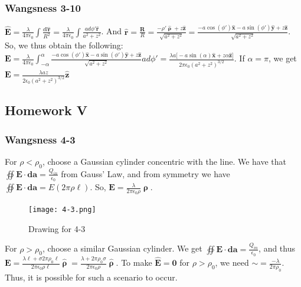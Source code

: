 \documentclass{article}
\theoremstyle{mystyle}
\begin{document}
\subsubsection{Wangsness 3-10}
$\hat{\mathbf{E}} = \frac{\lambda}{4\pi\epsilon_0} \int \frac{dl \hat{\mathbf{r}}}{R^2} = \frac{\lambda}{4\pi \epsilon_0} \int \frac{ad\phi' \hat{\mathbf{r}}}{a^2+z^2}$. And $\hat{\mathbf{r}} = \frac{\mathbf{R}}{R} = \frac{-\rho' \hat{\boldsymbol{\uprho}}+z\hat{\mathbf{z}}}{\sqrt{a^2+z^2}} = \frac{-a\cos(\phi')\hat{\mathbf{x}}-a\sin(\phi')\hat{\mathbf{y}}+z\hat{\mathbf{z}}}{\sqrt{a^2+z^2}}$. So, we thus obtain the following: \\ $\mathbf{E} = \frac{\lambda}{4\pi \epsilon_0} \int_{-\alpha}^{\alpha} \frac{-a\cos(\phi')\hat{\mathbf{x}}-a\sin(\phi')\hat{\mathbf{y}}+z\hat{\mathbf{z}}}{\sqrt{a^2+z^2}}ad\phi' = \frac{\lambda a\big[ -a\sin(\alpha)\hat{\mathbf{x}}+z\alpha \hat{\mathbf{z}}\big]}{2\pi \epsilon_0 (a^2+z^2)^{3/2}}$. If $\alpha = \pi$, we get $\mathbf{E} = \frac{\lambda a z}{2\epsilon_0 (a^2+z^2)^{3/2}}\hat{\mathbf{z}}$
\subsection{Homework V}
\subsubsection{Wangsness 4-3}
For $\rho<\rho_0$, choose a Gaussian cylinder concentric with the line. We have that $\oiint \mathbf{E}\cdot \mathbf{da} = \frac{Q_{in}}{\epsilon_0}$ from Gauss' Law, and from symmetry we have $\oiint \mathbf{E}\cdot \mathbf{da} = E(2\pi \rho \ell)$. So, $\mathbf{E} = \frac{\lambda}{2\pi \epsilon_0 \rho}\hat{\boldsymbol{\uprho}}$.
\begin{figure}[htbp]
\begin{center}
\texttt{[image: 4-3.png]}
\end{center}
\caption{Drawing for 4-3}
\end{figure}
For $\rho>\rho_0$, choose a similar Gaussian cylinder. We get $\oiint \mathbf{E}\cdot \mathbf{da} = \frac{Q_{in}}{\epsilon_0}$, and thus $\mathbf{E} = \frac{\lambda \ell + \sigma 2\pi \rho_0 \ell}{2\pi \epsilon_0 \rho \ell}\hat{\boldsymbol{\uprho}} = \frac{\lambda+2\pi \rho_0 \sigma}{2\pi \epsilon_0 \rho}\hat{\boldsymbol{\uprho}}$. To make $\hat{\mathbf{E}} = \mathbf{0}$ for $\rho>\rho_0$, we need $\sim = \frac{-\lambda}{2\pi \rho_0}$. Thus, it is possible for such a scenario to occur.
\end{document}
